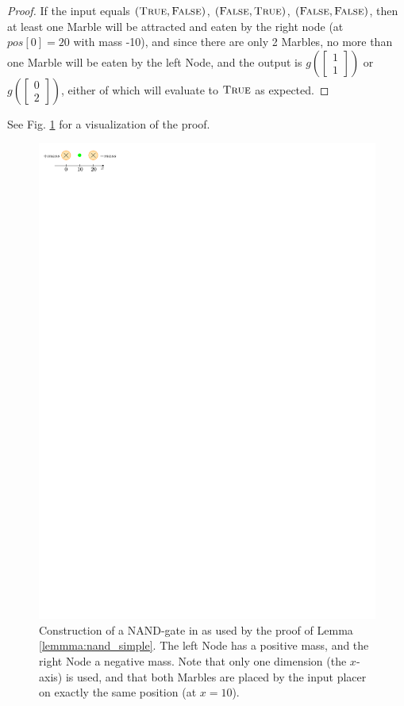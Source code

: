 \begin{proof}
    If the input equals $(\textsc{True}, \textsc{False})$, $(\textsc{False}, \textsc{True})$, $(\textsc{False}, \textsc{False})$, then at least one Marble will be attracted and eaten by the right node (at $pos[0] = 20$ with mass -10), and since there are only 2 Marbles, no more than one Marble will be eaten by the left Node, and the output is $g(\begin{bmatrix}1\\1\end{bmatrix})$ or $g(\begin{bmatrix}0\\2\end{bmatrix})$, either of which will evaluate to $\textsc{True}$ as expected.
\end{proof}
See Fig. \ref{fig:nand_simple} for a visualization of the proof.

\begin{figure}[h]
	\centering
	\includegraphics[scale=1.5]{figures/nand_simple.pdf}
	\caption{Construction of a NAND-gate in \nenwin as used by the proof of Lemma \ref{lemmma:nand_simple}. The left Node has a positive mass, and the right Node a negative mass. Note that only one dimension (the $x$-axis) is used, and that both Marbles are placed by the input placer on exactly the same position (at $x = 10$).}
	\label{fig:nand_simple}
\end{figure}

